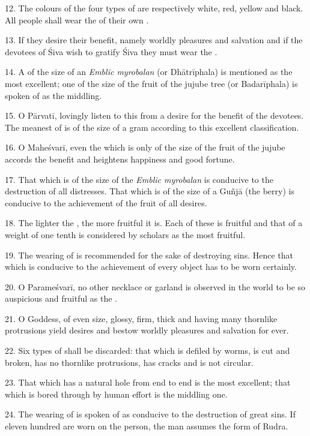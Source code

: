 12. The colours of the four types of  are respectively white, red,
yellow and black. All people shall wear the  of their own
.

13. If they desire their benefit, namely worldly pleasures and salvation and if
the devotees of Śiva wish to gratify Śiva they must wear the .

14. A  of the size of an \emph{Emblic myrobalan} (or Dhātrīphala)
is mentioned as the most excellent; one of the size of the fruit of the jujube
tree (or Badarīphala) is spoken of as the middling.

15. O Pārvatī, lovingly listen to this from a desire for the benefit of
the devotees. The meanest of  is of the size of a gram according
to this excellent classification.

16. O Maheśvarī, even the  which is only of the size of the fruit
of the jujube accords the benefit and heightens happiness and good fortune.

17. That which is of the size of the \emph{Emblic myrobalan} is conducive to
the destruction of all distresses. That which is of the size of a Guñjā (the
berry) is conducive to the achievement of the fruit of all desires.

18. The lighter the , the more fruitful it is. Each of these is
fruitful and that of a weight of one tenth is considered by scholars as the most
fruitful.

19. The wearing of  is recommended for the sake of destroying sins.
Hence that which is conducive to the achievement of every object has to be worn
certainly.

20. O Parameśvarī, no other necklace or garland is observed in the world to be
so auspicious and fruitful as the .

21. O Goddess,  of even size, glossy, firm, thick and having many
thornlike protrusions yield desires and bestow worldly pleasures and salvation
for ever.

22. Six types of  shall be discarded: that which is defiled by
worms, is cut and broken, has no thornlike protrusions, has cracks and is not
circular.

23. That which has a natural hole from end to end is the most excellent; that
which is bored through by human effort is the middling one.

24. The wearing of  is spoken of as conducive to the destruction of
great sins. If eleven hundred  are worn on the person, the man
assumes the form of Rudra.

